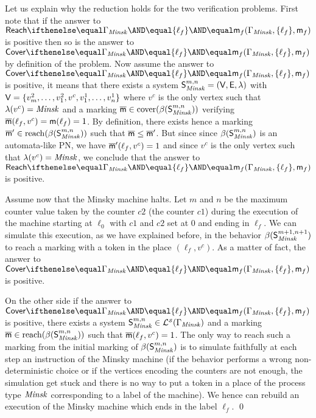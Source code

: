 Let us explain why the reduction holds for the two verification problems.
First note that if the answer to $\paramreach{\grammar_{\Minsk}}{\{\ell_f\}}{\amark_f}$
is positive then so is the answer to $\paramcover{\grammar_{\Minsk}}{\{\ell_f\}}{\amark_f}$
by definition of the problem.
Now assume the answer to $\paramcover{\grammar_{\Minsk}}{\{\ell_f\}}{\amark_f}$ is positive,
it means that there exists a system $\mathsf{S}^{m,n}_{\mathit{Minsk}}=(\mathsf{V},\mathsf{E},\lambda)$
with $\mathsf{V}=\{v^2_m,\ldots,v^2_1,v^c,v^1_1,\ldots,v^1_n\}$
where $v^c$ is the only vertex such that $\lambda(v^c)=\mathit{Minsk}$
and a marking $\overline{\mathsf{m}}\in\mathrm{cover}({\beta({\mathsf{S}^{m,n}_{\mathit{Minsk}}})})$ verifying
$\overline{\mathsf{m}}(\ell_f,v^c)=\mathsf{m}(\ell_f)=1$.
By definition, there exists hence a marking $\overline{\mathsf{m}}' \in \mathrm{reach}({\beta({\mathsf{S}^{m,n}_{\mathit{Minsk}}})})$
such that $\overline{\mathsf{m}} \leq \overline{\mathsf{m}}'$.
But since since $\beta({\mathsf{S}^{m,n}_{\mathit{Minsk}}})$ is an automata-like PN,
we have $\overline{\mathsf{m}}'(\ell_f,v^c)=1$ and since $v^c$ is the only vertex such that $\lambda(v^c)=\mathit{Minsk}$,
we conclude that the answer to $\paramreach{\grammar_{\Minsk}}{\{\ell_f\}}{\amark_f}$ is positive.




Assume now that the Minsky machine halts.
Let $m$ and $n$ be the maximum counter value taken by the counter $c2$ (\resp the counter $c1$)
during the execution of the machine starting at $\ell_0$ with $c1$ and $c2$ set at $0$ and ending in $\ell_f$.
We can simulate this execution, as we have explained before, in the behavior $\beta({\mathsf{S}^{m+1,n+1}_{\mathit{Minsk}}})$
to reach a marking with a token in the place $(\ell_f,v^c)$.
As a matter of fact, the answer to $\paramcover{\grammar_{\Minsk}}{\{\ell_f\}}{\amark_f}$ is positive.

On the other side if the answer to $\paramcover{\grammar_\Minsk}{\{\ell_f\}}{\amark_f}$ is positive,
there exists a system $\mathsf{S}^{m,n}_{\mathit{Minsk}} \in \mathcal{L}_{}^{\scriptscriptstyle{\mathcal{S}}}({\Gamma_{\mathit{Minsk}}})$
and a marking $\overline{\mathsf{m}} \in \mathrm{reach}({\beta({\mathsf{S}^{m,n}_{\mathit{Minsk}}})})$
such that $\overline{\mathsf{m}}(\ell_f,v^c)=1$.
The only way to reach such a marking from the initial marking of $\beta({\mathsf{S}^{m,n}_{\mathit{Minsk}}})$
is to simulate faithfully at each step an instruction of the Minsky machine
(if the behavior performs a wrong non-deterministic choice or if the vertices encoding the counters are not enough,
the simulation get stuck and there is no way to put a token in a place of the process type $\mathit{Minsk}$ corresponding to a label of the machine).
We hence can rebuild an execution of the Minsky machine which ends in the label $\ell_f$. \qed

